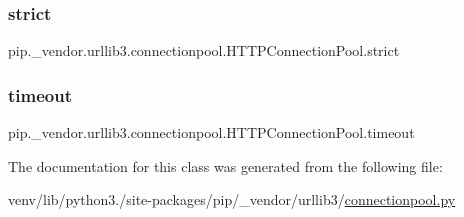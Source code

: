 \subsubsection{\texorpdfstring{strict}{strict}}
{\footnotesize\ttfamily pip.\+\_\+vendor.\+urllib3.\+connectionpool.\+H\+T\+T\+P\+Connection\+Pool.\+strict}

\mbox{\label{classpip_1_1__vendor_1_1urllib3_1_1connectionpool_1_1HTTPConnectionPool_a43c45441e89c527cd109ddcfdd371e62}} 
\subsubsection{\texorpdfstring{timeout}{timeout}}
{\footnotesize\ttfamily pip.\+\_\+vendor.\+urllib3.\+connectionpool.\+H\+T\+T\+P\+Connection\+Pool.\+timeout}



The documentation for this class was generated from the following file\+:\begin{DoxyCompactItemize}
\item 
venv/lib/python3./site-\/packages/pip/\+\_\+vendor/urllib3/\hyperlink{connectionpool_8py}{connectionpool.\+py}\end{DoxyCompactItemize}
